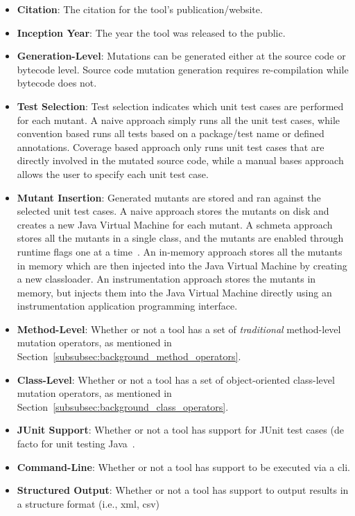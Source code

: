 \begin{itemize}
  \item \textbf{Citation}: The citation for the tool's publication/website.
  \item \textbf{Inception Year}: The year the tool was released to the public.
  \item \textbf{Generation-Level}: Mutations can be generated either at the source code or bytecode level. Source code mutation generation requires re-compilation while bytecode does not.
  \item \textbf{Test Selection}: Test selection indicates which unit test cases are performed for each mutant. A naive approach simply runs all the unit test cases, while convention based runs all tests based on a package/test name or defined annotations. Coverage based approach only runs unit test cases that are directly involved in the mutated source code, while a manual bases approach allows the user to specify each unit test case.
  \item \textbf{Mutant Insertion}: Generated mutants are stored and ran against the selected unit test cases. A naive approach stores the mutants on disk and creates a new Java Virtual Machine for each mutant. A schmeta approach stores all the mutants in a single class, and the mutants are enabled through runtime flags one at a time~\cite{UOH93}. An in-memory approach stores all the mutants in memory which are then injected into the Java Virtual Machine by creating a new classloader. An instrumentation approach stores the mutants in memory, but injects them into the Java Virtual Machine directly using an instrumentation application programming interface.
  \item \textbf{Method-Level}: Whether or not a tool has a set of \emph{traditional} method-level mutation operators, as mentioned in Section~\ref{subsubsec:background_method_operators}.
  \item \textbf{Class-Level}: Whether or not a tool has a set of object-oriented class-level mutation operators, as mentioned in Section~\ref{subsubsec:background_class_operators}.
  \item \textbf{JUnit Support}: Whether or not a tool has support for JUnit test cases (de facto for unit testing Java~\cite{JUnit}.
  \item \textbf{Command-Line}: Whether or not a tool has support to be executed via a \gls{cli}.
  \item \textbf{Structured Output}: Whether or not a tool has support to output results in a structure format (i.e., \gls{xml}, \gls{csv})

\end{itemize}
